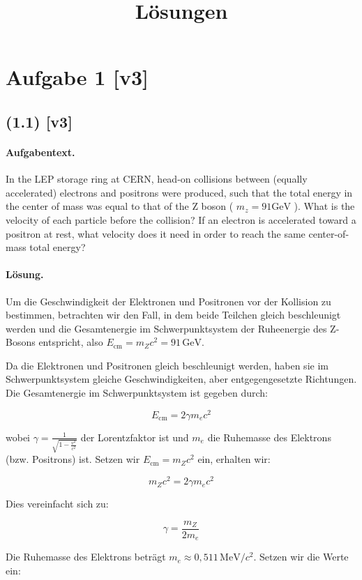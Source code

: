 \documentclass[11pt,a4paper]{article}
\title{Lösungen}
\date{}
\begin{document}
\maketitle

\section*{Aufgabe 1 [v3]}
\subsection*{(1.1) [v3]}
\paragraph{Aufgabentext.}
In the LEP storage ring at CERN, head-on collisions between (equally accelerated) electrons and positrons were produced, such that the total energy in the center of mass was equal to that of the Z boson ( $m_z=91 \mathrm{GeV}$ ). What is the velocity of each particle before the collision? If an electron is accelerated toward a positron at rest, what velocity does it need in order to reach the same center-of-mass total energy?

\paragraph{Lösung.}
Um die Geschwindigkeit der Elektronen und Positronen vor der Kollision zu bestimmen, betrachten wir den Fall, in dem beide Teilchen gleich beschleunigt werden und die Gesamtenergie im Schwerpunktsystem der Ruheenergie des Z-Bosons entspricht, also \( E_{\text{cm}} = m_Z c^2 = 91 \, \text{GeV} \).

Da die Elektronen und Positronen gleich beschleunigt werden, haben sie im Schwerpunktsystem gleiche Geschwindigkeiten, aber entgegengesetzte Richtungen. Die Gesamtenergie im Schwerpunktsystem ist gegeben durch:

\[
E_{\text{cm}} = 2 \gamma m_e c^2
\]

wobei \( \gamma = \frac{1}{\sqrt{1 - \frac{v^2}{c^2}}} \) der Lorentzfaktor ist und \( m_e \) die Ruhemasse des Elektrons (bzw. Positrons) ist. Setzen wir \( E_{\text{cm}} = m_Z c^2 \) ein, erhalten wir:

\[
m_Z c^2 = 2 \gamma m_e c^2
\]

Dies vereinfacht sich zu:

\[
\gamma = \frac{m_Z}{2 m_e}
\]

Die Ruhemasse des Elektrons beträgt \( m_e \approx 0{,}511 \, \text{MeV}/c^2 \). Setzen wir die Werte ein:
\end{document}
